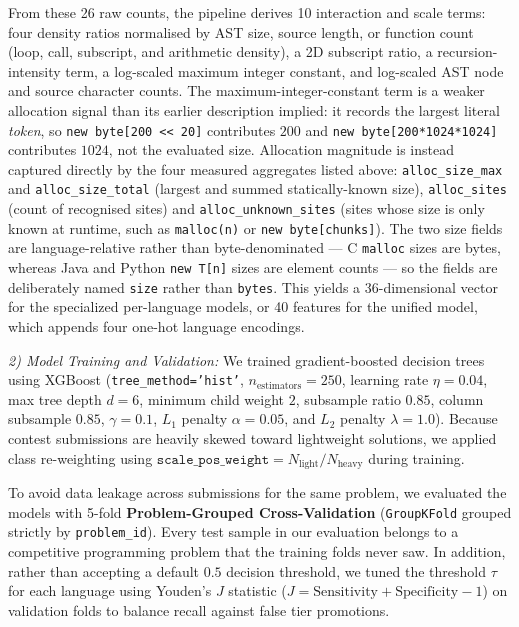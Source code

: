 \documentclass[conference]{IEEEtran}
\begin{document}
From these 26 raw counts, the pipeline derives 10 interaction and scale terms: four density ratios normalised by AST size, source length, or function count (loop, call, subscript, and arithmetic density), a 2D subscript ratio, a recursion-intensity term, a log-scaled maximum integer constant, and log-scaled AST node and source character counts. The maximum-integer-constant term is a weaker allocation signal than its earlier description implied: it records the largest literal \emph{token}, so \texttt{new byte[200 << 20]} contributes $200$ and \texttt{new byte[200*1024*1024]} contributes $1024$, not the evaluated size. Allocation magnitude is instead captured directly by the four measured aggregates listed above: \texttt{alloc\_size\_max} and \texttt{alloc\_size\_total} (largest and summed statically-known size), \texttt{alloc\_sites} (count of recognised sites) and \texttt{alloc\_unknown\_sites} (sites whose size is only known at runtime, such as \texttt{malloc(n)} or \texttt{new byte[chunks]}). The two size fields are language-relative rather than byte-denominated --- C \texttt{malloc} sizes are bytes, whereas Java and Python \texttt{new T[n]} sizes are element counts --- so the fields are deliberately named \texttt{size} rather than \texttt{bytes}. This yields a 36-dimensional vector for the specialized per-language models, or 40 features for the unified model, which appends four one-hot language encodings.

\textit{2) Model Training and Validation:}
We trained gradient-boosted decision trees using XGBoost (\texttt{tree\_method='hist'}, $n_{\mathrm{estimators}} = 250$, learning rate $\eta = 0.04$, max tree depth $d = 6$, minimum child weight $2$, subsample ratio $0.85$, column subsample $0.85$, $\gamma = 0.1$, $L_1$ penalty $\alpha = 0.05$, and $L_2$ penalty $\lambda = 1.0$). Because contest submissions are heavily skewed toward lightweight solutions, we applied class re-weighting using $\texttt{scale\_pos\_weight} = N_{\mathrm{light}} / N_{\mathrm{heavy}}$ during training.

To avoid data leakage across submissions for the same problem, we evaluated the models with 5-fold \textbf{Problem-Grouped Cross-Validation} (\texttt{GroupKFold} grouped strictly by \texttt{problem\_id}). Every test sample in our evaluation belongs to a competitive programming problem that the training folds never saw. In addition, rather than accepting a default $0.5$ decision threshold, we tuned the threshold $\tau$ for each language using Youden's $J$ statistic ($J = \mathrm{Sensitivity} + \mathrm{Specificity} - 1$) on validation folds to balance recall against false tier promotions.
\end{document}
